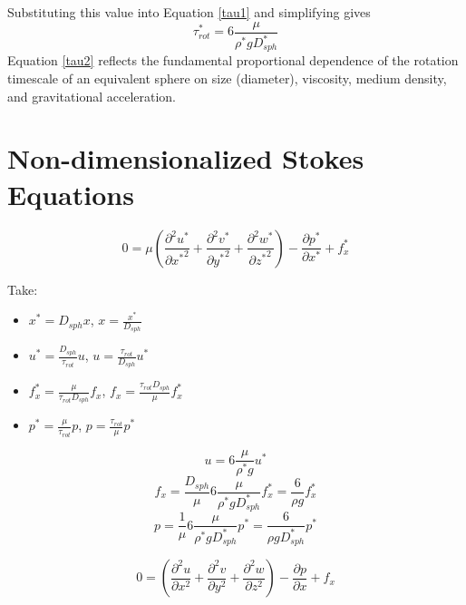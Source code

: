 \documentclass[10pt,a4paper]{article}
\def\p{\partial}
\begin{document}
Substituting this value into Equation \ref{tau1} and simplifying gives
\begin{equation}\label{tau2}
	\tau_{rot}^* = 6 \frac{\mu}{\rho^* g D_{sph}^*}
\end{equation}
Equation \ref{tau2} reflects the fundamental proportional dependence of the rotation timescale of an equivalent sphere on size (diameter), viscosity, medium density, and gravitational acceleration.


\section{Non-dimensionalized Stokes Equations}

\begin{equation}\label{Stokes1}
	0 = \mu \left( \frac{\p^2 u^*}{\p {x^*}^2}+\frac{\p^2 v^*}{\p {y^*}^2}+\frac{\p^2 w^*}{\p {z^*}^2} \right) - \frac{\p p^*}{\p {x^*}} + f_x^*
\end{equation}

Take:
\begin{itemize}
	\item $x^* = D_{sph} x$, $x = \frac{x^*}{D_{sph}}$
	\item $u^* = \frac{D_{sph}}{\tau_{rot}} u$, $u = \frac{\tau_{rot}}{D_{sph}} u^*$
	\item $f_x^* = \frac{\mu}{\tau_{rot} D_{sph}} f_x$, $f_x = \frac{\tau_{rot} D_{sph}}{\mu} f_x^*$
	\item $p^* = \frac{\mu}{\tau_{rot}} p$, $p = \frac{\tau_{rot}}{\mu} p^*$
\end{itemize}


\begin{equation}\label{blah3}
	u = 6 \frac{\mu}{\rho^* g } u^*
\end{equation}
\begin{equation}\label{blah}
	f_x = \frac{D_{sph}}{\mu} 6 \frac{\mu}{\rho^* g D_{sph}^*} f_x^* = \frac{6}{\rho g} f_x^*
\end{equation}
\begin{equation}\label{blah2}
	p = \frac{1}{\mu} 6 \frac{\mu}{\rho^* g D_{sph}^*} p^* = \frac{6}{\rho g D_{sph}^*} p^*
\end{equation}

\begin{equation}\label{Stokes2}
	0 = \left( \frac{\p^2 u}{\p x^2}+\frac{\p^2 v}{\p y^2}+\frac{\p^2 w}{\p z^2} \right) - \frac{\p p}{\p x} + f_x
\end{equation}

\end{document}
